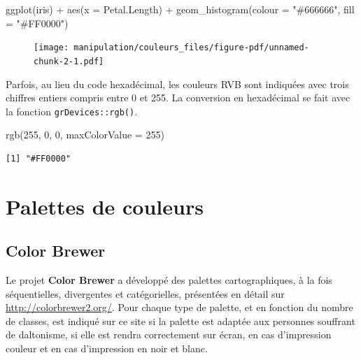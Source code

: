 \documentclass[
  letterpaper,
  DIV=11,
  numbers=noendperiod,
  oneside]{scrreprt}
\newenvironment{Shaded}{\begin{snugshade}}{\end{snugshade}}
\newcommand{\AttributeTok}[1]{\textcolor[rgb]{0.40,0.45,0.13}{#1}}
\newcommand{\DecValTok}[1]{\textcolor[rgb]{0.68,0.00,0.00}{#1}}
\newcommand{\FunctionTok}[1]{\textcolor[rgb]{0.28,0.35,0.67}{#1}}
\newcommand{\NormalTok}[1]{\textcolor[rgb]{0.00,0.23,0.31}{#1}}
\newcommand{\SpecialCharTok}[1]{\textcolor[rgb]{0.37,0.37,0.37}{#1}}
\newcommand{\StringTok}[1]{\textcolor[rgb]{0.13,0.47,0.30}{#1}}
\begin{document}
\begin{Shaded}
\begin{Highlighting}[]
\FunctionTok{ggplot}\NormalTok{(iris) }\SpecialCharTok{+}
  \FunctionTok{aes}\NormalTok{(}\AttributeTok{x =}\NormalTok{ Petal.Length) }\SpecialCharTok{+}
  \FunctionTok{geom\_histogram}\NormalTok{(}\AttributeTok{colour =} \StringTok{"\#666666"}\NormalTok{, }\AttributeTok{fill =} \StringTok{"\#FF0000"}\NormalTok{) }
\end{Highlighting}
\end{Shaded}

\begin{figure}[H]

{\centering \texttt{[image: manipulation/couleurs\_files/figure-pdf/unnamed-chunk-2-1.pdf]}

}

\end{figure}

Parfois, au lieu du code hexadécimal, les couleurs RVB sont indiquées
avec trois chiffres entiers compris entre 0 et 255. La conversion en
hexadécimal se fait avec la fonction \texttt{grDevices::rgb()}.

\begin{Shaded}
\begin{Highlighting}[]
\FunctionTok{rgb}\NormalTok{(}\DecValTok{255}\NormalTok{, }\DecValTok{0}\NormalTok{, }\DecValTok{0}\NormalTok{, }\AttributeTok{maxColorValue =} \DecValTok{255}\NormalTok{)}
\end{Highlighting}
\end{Shaded}

\begin{verbatim}
[1] "#FF0000"
\end{verbatim}

\hypertarget{palettes-de-couleurs}{%
\section{Palettes de couleurs}\label{palettes-de-couleurs}}

\hypertarget{color-brewer}{%
\subsection{Color Brewer}\label{color-brewer}}

Le projet \textbf{Color Brewer} a développé des palettes
cartographiques, à la fois séquentielles, divergentes et catégorielles,
présentées en détail sur \url{http://colorbrewer2.org/}. Pour chaque
type de palette, et en fonction du nombre de classes, est indiqué sur ce
site si la palette est adaptée aux personnes souffrant de daltonisme, si
elle est rendra correctement sur écran, en cas d'impression couleur et
en cas d'impression en noir et blanc.
\end{document}
